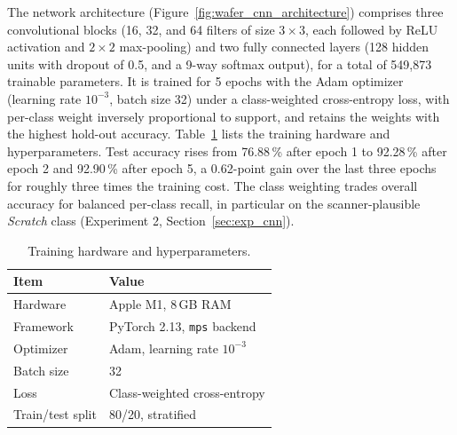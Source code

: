 The network architecture (Figure~\ref{fig:wafer_cnn_architecture}) comprises three convolutional blocks (16, 32, and 64 filters of size $3\times3$, each followed by ReLU activation and $2\times2$ max-pooling) and two fully connected layers (128 hidden units with dropout of 0.5, and a 9-way softmax output), for a total of 549{,}873 trainable parameters. It is trained for 5 epochs with the Adam optimizer (learning rate $10^{-3}$, batch size 32) under a class-weighted cross-entropy loss, with per-class weight inversely proportional to support, and retains the weights with the highest hold-out accuracy. Table~\ref{tab:hw} lists the training hardware and hyperparameters. Test accuracy rises from 76.88\,\% after epoch 1 to 92.28\,\% after epoch 2 and 92.90\,\% after epoch 5, a 0.62-point gain over the last three epochs for roughly three times the training cost. The class weighting trades overall accuracy for balanced per-class recall, in particular on the scanner-plausible \textit{Scratch} class (Experiment 2, Section~\ref{sec:exp_cnn}).

\begin{table}[htbp]
\centering
\caption{Training hardware and hyperparameters.}
\label{tab:hw}
\begin{tabular}{ll}
\toprule
Item & Value \\
\midrule
Hardware          & Apple M1, 8\,GB RAM \\
Framework         & PyTorch 2.13, \texttt{mps} backend \\
Optimizer         & Adam, learning rate $10^{-3}$ \\
Batch size        & 32 \\
Loss              & Class-weighted cross-entropy \\
Train/test split  & 80/20, stratified \\
\bottomrule
\end{tabular}
\end{table}

